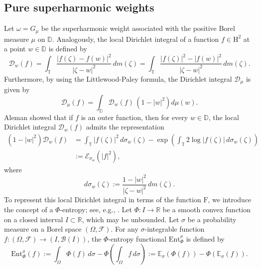 \documentclass[12pt,reqno,a4paper]{amsart}
\newcommand{\hH}{\mathrm{H^2 }}
\newcommand\DD{\mathbb{D}}
\newcommand{\FF}{\mathrm{F}}
\newcommand{\cD}{{\mathcal{D}}}
\numberwithin{equation}{section}
\begin{document}
\subsection{Pure superharmonic weights}
Let $\omega = G_\mu$ be the superharmonic weight associated with the positive Borel measure $\mu $ on $\DD$.  Analogously, the local Dirichlet integral of a function \( f \in \hH \) at a point \( w \in \mathbb{D} \) is defined by
\[
\cD_w(f) = \int_{\mathbb{T}} \frac{|f(\zeta)-f(w)|^2}{|\zeta - w|^2} \, dm(\zeta)=\int_{\mathbb{T}} \frac{|f(\zeta)|^2 - |f(w)|^2}{|\zeta - w|^2} \, dm(\zeta).
\]
Furthermore, by using the Littlewood-Paley formula, the Dirichlet integral {$\cD_\mu$} is given by
\[
\cD_\mu(f) = \int_{\mathbb{D}} \cD_w(f) \, (1-|w|^2)d\mu(w).
\]
Aleman \cite{A2} showed that if \( f \) is an outer function, then for every $w\in\DD$, the local Dirichlet integral \(\cD_w(f)\) admits the representation
\begin{align}\label{Efunction}
	(1 - |w|^2) \cD_w(f) &= \int_{\mathbb{T}} |f(\zeta)|^2 \, d\sigma_w(\zeta) - \exp\left( \int_{\mathbb{T}} 2\log |f(\zeta)| \, d\sigma_w(\zeta) \right)\nonumber\\
	&:=\mathcal{E}_{\sigma_w}(|f|^2),
\end{align}
where \[ d\sigma_w(\zeta) := \frac{1 - |w|^2}{|\zeta - w|^2} \, dm(\zeta) .\]
%
To represent this local Dirichlet integral in terms of the function \( \FF \), we introduce the concept of a \(\Phi\)-entropy; see, e.g., \cite{Chaf}. Let \( \Phi: I \to \mathbb{R} \) be a smooth convex function on a closed interval \( I \subset \mathbb{R} \), which may be unbounded. %
Let \( \sigma \) be a probability measure on a Borel space \( (\Omega, \mathcal{F}) \). For any \( \sigma \)-integrable function \( f : (\Omega, \mathcal{F}) \to (I, \mathcal{B}(I)) \), the \( \Phi \)-entropy functional \( \mathrm{Ent}_\Phi^\sigma \) is defined by
\[
\text{Ent}_\Phi^\sigma(f) := \int_\Omega \Phi(f) \, d\sigma - \Phi\left(\int_\Omega f \, d\sigma\right) := \mathbb{E}_\sigma(\Phi(f)) - \Phi(\mathbb{E}_\sigma(f)).
\]
\end{document}
